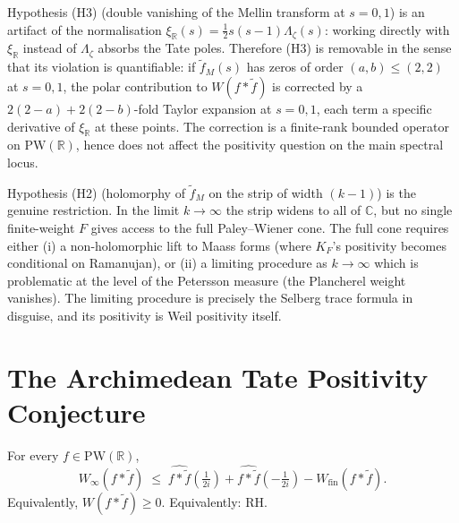 \begin{remark}[H3 is removable]
\label{v4-arith:w5-a:rem:H3-removable}
Hypothesis (H3) (double vanishing of the Mellin transform at \(s=0,1\))
is an artifact of the normalisation
\(\xi_{\mathbb{R}}(s)=\frac{1}{2}s(s-1)\Lambda_{\zeta}(s)\): working
directly with \(\xi_{\mathbb{R}}\) instead of \(\Lambda_{\zeta}\) absorbs
the Tate poles. Therefore (H3) is removable in the sense that its
violation is quantifiable: if \(\widetilde{f}_{M}(s)\) has zeros of
order \((a,b)\leq(2,2)\) at \(s=0,1\), the polar contribution to
\(W(f*\widetilde{f})\) is corrected by a \(2(2-a)+2(2-b)\)-fold Taylor
expansion at \(s=0,1\), each term a specific derivative of
\(\xi_{\mathbb{R}}\) at these points. The correction is a finite-rank
bounded operator on \(\mathrm{PW}(\mathbb{R})\), hence does not affect
the positivity question on the main spectral locus.
\end{remark}

\begin{remark}
\label{v4-arith:w5-a:rem:H2-obstruction}
Hypothesis (H2) (holomorphy of \(\widetilde{f}_{M}\) on the strip of
width \((k-1)\)) is the genuine restriction. In the limit
\(k\to\infty\) the strip widens to all of \(\mathbb{C}\), but no single
finite-weight \(F\) gives access to the full Paley--Wiener cone. The
full cone requires either (i) a non-holomorphic lift to Maass forms
(where \(K_{F}\)'s positivity becomes conditional on Ramanujan), or
(ii) a limiting procedure as \(k\to\infty\) which is problematic at
the level of the Petersson measure (the Plancherel weight vanishes).
The limiting procedure is precisely the Selberg trace formula in
disguise, and its positivity is Weil positivity itself.
\end{remark}

\section{The Archimedean Tate Positivity Conjecture}
\label{v4-arith:w5-a:irreducible-obstruction}

\begin{conjecture}
\label{v4-arith:w5-a:conj:archimedean-tate-positivity}
For every \(f\in\mathrm{PW}(\mathbb{R})\),
\begin{equation}
\label{v4-arith:w5-a:eq:archimedean-tate-positivity}
W_{\infty}(f*\widetilde{f})\;\leq\;
\widehat{f*\widetilde{f}}(\tfrac{1}{2i})+
\widehat{f*\widetilde{f}}(-\tfrac{1}{2i})-
W_{\mathrm{fin}}(f*\widetilde{f}).
\end{equation}
Equivalently, \(W(f*\widetilde{f})\geq0\). Equivalently: RH.
\end{conjecture}


